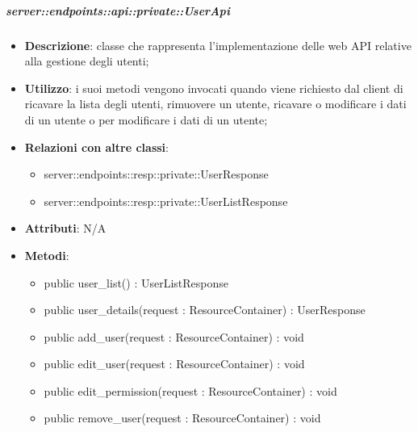     \subparagraph{server::endpoints::api::private::UserApi} %
    \label{subp:bdsm_app_server_endpoints_api_private_userapi}
    \begin{itemize}
      \item \textbf{Descrizione}: classe che rappresenta l'implementazione delle web API relative alla gestione degli utenti;
      \item \textbf{Utilizzo}: i suoi metodi vengono invocati quando viene richiesto dal client di ricavare la lista degli utenti, rimuovere un utente, ricavare o modificare i dati di un utente o per modificare i dati di un utente;
      \item \textbf{Relazioni con altre classi}:
        \begin{itemize}
          \item server::endpoints::resp::private::UserResponse
          \item server::endpoints::resp::private::UserListResponse
        \end{itemize}
		\item \textbf{Attributi}: N/A
		\item \textbf{Metodi}:   
			\begin{itemize}
				\item public user\_list() : UserListResponse
				\item public user\_details(request : ResourceContainer) : UserResponse
				\item public add\_user(request : ResourceContainer) : void
				\item public edit\_user(request : ResourceContainer) : void
				\item public edit\_permission(request : ResourceContainer) : void
				\item public remove\_user(request : ResourceContainer) : void
     	 \end{itemize}
      \end{itemize}


